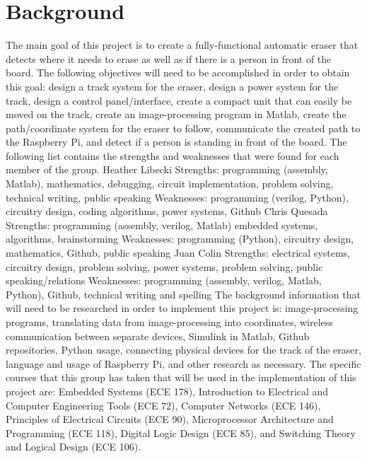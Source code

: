 \documentclass{IEEEtran}					%
\begin{document}
	\section{Background}
	The main goal of this project is to create a fully-functional automatic eraser that detects where it needs to erase as well as if there is a person in front of the board. The following objectives will need to be accomplished in order to obtain this goal: design a track system for the eraser, design a power system for the track, design a control panel/interface, create a compact unit that can easily be moved on the track, create an image-processing program in Matlab, create the path/coordinate system for the eraser to follow, communicate the created path to the Raspberry Pi, and detect if a person is standing in front of the board.
	The following list contains the strengths and weaknesses that were found for each member of the group.
	Heather Libecki
	Strengths: programming (assembly, Matlab), mathematics, debugging, circuit implementation, problem solving, technical writing, public speaking
	Weaknesses: programming (verilog, Python), circuitry design, coding algorithms, power systems, Github
	Chris Quesada
	Strengths: programming (assembly, verilog, Matlab) embedded systems, algorithms, brainstorming
	Weaknesses: programming (Python), circuitry design, mathematics, Github, public speaking
	Juan Colin
	Strengths: electrical systems, circuitry design, problem solving, power systems, problem solving, public speaking/relations
	Weaknesses: programming (assembly, verilog, Matlab, Python), Github, technical writing and spelling
	The background information that will need to be researched in order to implement this project is: image-processing programs, translating data from image-processing into coordinates, wireless communication between separate devices, Simulink in Matlab, Github repositories, Python usage, connecting physical devices for the track of the eraser, language and usage of Raspberry Pi, and other research as necessary. The specific courses that this group has taken that will be used in the implementation of this project are: Embedded Systems (ECE 178), Introduction to Electrical and Computer Engineering Tools (ECE 72), Computer Networks (ECE 146), Principles of Electrical Circuits (ECE 90), Microprocessor Architecture and Programming (ECE 118), Digital Logic Design (ECE 85), and Switching Theory and Logical Design (ECE 106).
	
\end{document}
